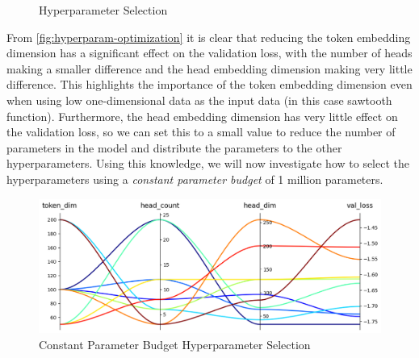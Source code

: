 \documentclass[../../main.tex]{subfiles}
\begin{document}
\begin{figure}[H]
	\centering
	\qquad
	\qquad
	\caption{Hyperparameter Selection}
	\label{fig:hyperparam-optimization}
\end{figure}

From \autoref{fig:hyperparam-optimization} it is clear that reducing the token embedding dimension has a significant effect on the validation loss, with the number of heads making a smaller difference and the head embedding dimension making very little difference. This highlights the importance of the token embedding dimension even when using low one-dimensional data as the input data (in this case sawtooth function). Furthermore, the head embedding dimension has very little effect on the validation loss, so we can set this to a small value to reduce the number of parameters in the model and distribute the parameters to the other hyperparameters. Using this knowledge, we will now investigate how to select the hyperparameters using a \emph{constant parameter budget} of 1 million parameters. 


\FloatBarrier
\begin{figure}[ht!]
	\centering
	\includegraphics[width=0.7\linewidth]{./1m.png}
	\caption{Constant Parameter Budget Hyperparameter Selection}
	\label{fig:1m-parameter-budget}
\end{figure}
\FloatBarrier
\end{document}
